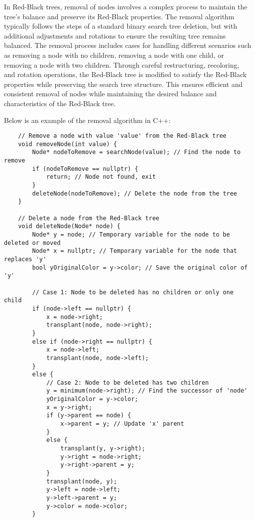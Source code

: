 In Red-Black trees, removal of nodes involves a complex process to maintain the tree's balance and preserve its Red-Black properties. The removal algorithm typically follows the steps of a standard binary search tree deletion, but with additional adjustments and rotations to ensure the resulting tree remains balanced. The removal process 
includes cases for handling different scenarios such as removing a node with no children, removing a node with one child, or removing a node with two children. Through careful restructuring, recoloring, and rotation operations, the Red-Black tree is modified to satisfy the Red-Black properties while preserving the search tree structure. This 
ensures efficient and consistent removal of nodes while maintaining the desired balance and characteristics of the Red-Black tree.

\begin{solution}

    Below is an example of the removal algorithm in C++:

    \horizontalline

    \begin{verbatim}
    // Remove a node with value 'value' from the Red-Black tree
    void removeNode(int value) {
        Node* nodeToRemove = searchNode(value); // Find the node to remove
        if (nodeToRemove == nullptr) {
            return; // Node not found, exit
        }
        deleteNode(nodeToRemove); // Delete the node from the tree
    }
    
    // Delete a node from the Red-Black tree
    void deleteNode(Node* node) {
        Node* y = node; // Temporary variable for the node to be deleted or moved
        Node* x = nullptr; // Temporary variable for the node that replaces 'y'
        bool yOriginalColor = y->color; // Save the original color of 'y'
    
        // Case 1: Node to be deleted has no children or only one child
        if (node->left == nullptr) {
            x = node->right;
            transplant(node, node->right);
        }
        else if (node->right == nullptr) {
            x = node->left;
            transplant(node, node->left);
        }
        else {
            // Case 2: Node to be deleted has two children
            y = minimum(node->right); // Find the successor of 'node'
            yOriginalColor = y->color;
            x = y->right;
            if (y->parent == node) {
                x->parent = y; // Update 'x' parent
            }
            else {
                transplant(y, y->right);
                y->right = node->right;
                y->right->parent = y;
            }
            transplant(node, y);
            y->left = node->left;
            y->left->parent = y;
            y->color = node->color;
        }
    

\end{verbatim}
\end{solution}
